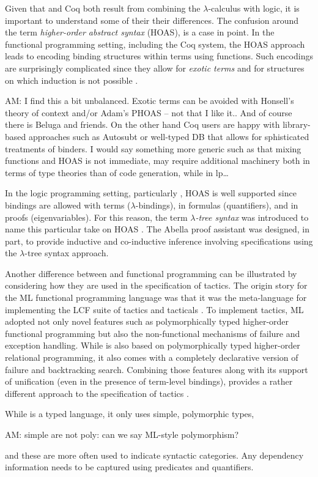 Given that \lP and Coq both result from combining the
$\lambda$-calculus with logic, it is important to understand some of
their their differences.  The confusion around the term
\emph{higher-order abstract syntax} (HOAS), is a case in point.  In
the functional programming setting, including the Coq system, the HOAS
approach leads to encoding binding structures within terms using
functions.  Such encodings are surprisingly complicated since they
allow for \emph{exotic terms} \cite{despeyroux95tlca} and for
structures on which induction is not possible \cite{roeckl01fossacs}.
\begin{metanote}
  AM: I find this a bit unbalanced. Exotic terms can be avoided with
  Honsell's theory of context and/or Adam's PHOAS -- not that I like
  it.. And of course there is Beluga and friends.  On the other hand
  Coq users are happy with library-based approaches such as Autosubt or well-typed DB
  that allows for sphisticated treatments of binders. I would say something more generic such as that mixing functions and HOAS is not immediate, may require additional machinery both in terms of type theories than of code generation, while in lp\dots
\end{metanote}
In the logic programming setting, particularly \lP, HOAS is well
supported since bindings are allowed with terms ($\lambda$-bindings),
in formulas (quantifiers), and in proofs (eigenvariables).  For this
reason, the term \emph{$\lambda$-tree syntax} was introduced to name
this particular take on HOAS \cite{miller19jar}.  The Abella proof
assistant \cite{baelde14jfr} was designed, in part, to provide
inductive and co-inductive inference involving specifications using
the $\lambda$-tree syntax approach.

Another difference between \lP and functional programming can be
illustrated by considering how they are used in the specification of
tactics.  The origin story for the ML functional programming
language was that it was the meta-language for implementing the LCF
suite of tactics and tacticals \cite{gordon79}.  To implement tactics,
ML adopted not only novel features such as polymorphically typed
higher-order functional programming but also the non-functional
mechanisms of failure and exception handling.  While \lP is also based
on polymorphically typed higher-order relational programming, it also
comes with a completely declarative version of failure and
backtracking search.  Combining those features along with its support
of unification (even in the presence of term-level bindings), \lP
provides a rather different approach to the specification of tactics
\cite{felty93jar}.


While \lP is a typed language, it only uses simple, polymorphic types,
\begin{metanote}
AM:  simple are not poly: can we say ML-style polymorphism?
\end{metanote}
and these are more often used to indicate syntactic categories.  Any
dependency information needs to be captured using predicates and
quantifiers.
